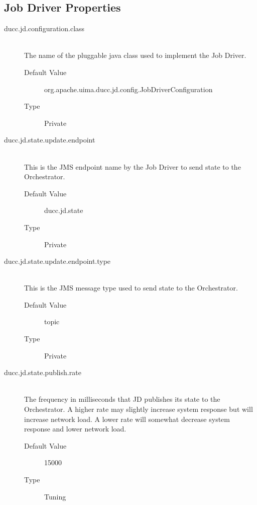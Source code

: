     
\subsection{Job Driver Properties}
    \begin{description}
        \item[ducc.jd.configuration.class] \hfill \\
          The name of the pluggable java class used to implement the Job Driver. 
          \begin{description}
            \item[Default Value] org.apache.uima.ducc.jd.config.JobDriverConfiguration 
            \item[Type] Private 
          \end{description}
          
        \item[ducc.jd.state.update.endpoint] \hfill \\
          This is the JMS endpoint name by the Job Driver to send state to the Orchestrator. 
          \begin{description}
            \item[Default Value] ducc.jd.state               
            \item[Type] Private 
          \end{description}
            

        \item[ducc.jd.state.update.endpoint.type] \hfill \\
          This is the JMS message type used to send state to the Orchestrator. 
          \begin{description}            
            \item[Default Value] topic 
            \item[Type] Private 
          \end{description}
          

        \item[ducc.jd.state.publish.rate] \hfill \\
          The frequency in milliseconds that JD publishes its state to the Orchestrator. A higher rate 
          may slightly increase system response but will increase network load. A lower rate will 
          somewhat decrease system response and lower network load. 
          \begin{description}
            \item[Default Value] 15000 
            \item[Type] Tuning 
          \end{description}


\end{description}
